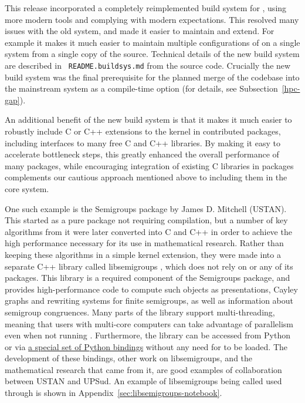 This release incorporated a completely
reimplemented build system for \GAP, using more modern tools and
complying with modern expectations. This resolved many issues with the
old system, and made it easier to maintain and extend. For example it
makes it much easier to maintain multiple configurations of \GAP on a
single system from a single copy of the source. Technical
details of the new build system are described in {\tt
  README.buildsys.md} from the \GAP source code. Crucially the new build system
was the final prerequisite for the planned  merge of the \HPCGAP codebase  into the
mainstream \GAP system as a compile-time option (for details, see
Subsection~\ref{hpc-gap}).

An additional benefit of the new build system is that it makes it much
easier to robustly include C or C++ extensions to the \GAP kernel in
contributed packages, including interfaces to many free C and C++
libraries. By making it easy to accelerate bottleneck steps, this
greatly enhanced the overall performance of many packages, while
encouraging integration of existing C libraries in packages complements
our cautious approach mentioned above to including them in the core
system.

One such example is the {\sf Semigroups} package \cite{Semigroups} by James D.
Mitchell (USTAN).  This started as a pure \GAP package not requiring compilation,
but a number of key algorithms from it were later converted into C and C++ in
order to achieve the high performance necessary for its use in mathematical
research.  Rather than keeping these algorithms in a simple \GAP kernel
extension, they were made into a separate C++ library called {\sf libsemigroups}
\cite{libsemigroups}, which does not rely on \GAP or any of its packages.  This
library is a required component of the {\sf Semigroups} package, and provides
high-performance code to compute such objects as presentations, Cayley graphs
and rewriting systems for finite semigroups, as well as information about
semigroup congruences.  Many parts of the library support multi-threading,
meaning that users with multi-core computers can take advantage of parallelism
even when not running \HPCGAP.  Furthermore, the library can be accessed from
Python or \Sage via \href{https://github.com/libsemigroups/libsemigroups-python-bindings}{a special set of Python bindings}
 without
any need for \GAP to be loaded.  The development of these bindings, other work
on {\sf libsemigroups}, and the mathematical research that came from it, are
good examples of \ODK collaboration between USTAN and UPSud.
An example of {\sf libsemigroups} being called used through \GAP is shown in
Appendix~\ref{sec:libsemigroups-notebook}.

